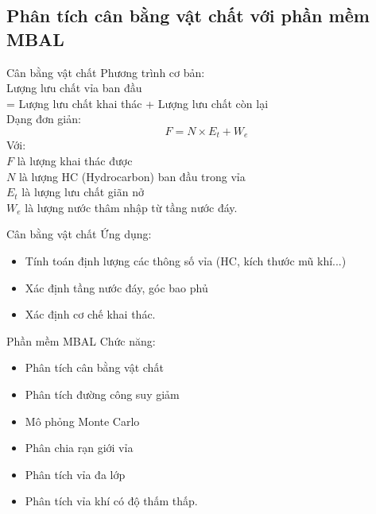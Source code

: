 \documentclass[11pt]{beamer}
\begin{document}
\subsection{Phân tích cân bằng vật chất với phần mềm MBAL}
\begin{frame}{Cân bằng vật chất}
Phương trình cơ bản:\\
\hspace*{1cm} Lượng lưu chất vỉa ban đầu\\
\hspace*{2cm} = Lượng lưu chất khai thác + Lượng lưu chất còn lại\\
Dạng đơn giản:
	\begin{equation}\label{eqn:straight_line}
		F = N \times{E_t} + W_e
	\end{equation}
Với:\\
\hspace*{1cm} $F$ là lượng khai thác được\\
\hspace*{1cm} $N$ là lượng HC (Hydrocarbon) ban đầu trong vỉa\\
\hspace*{1cm} $E_t$ là lượng lưu chất giãn nở\\
\hspace*{1cm} $W_e$ là lượng nước thâm nhập từ tầng nước đáy.
\end{frame}
\begin{frame}{Cân bằng vật chất}
Ứng dụng:
	\begin{itemize}
		\item Tính toán định lượng các thông số vỉa (HC, kích thước mũ khí...)
		\item Xác định tầng nước đáy, góc bao phủ
		\item Xác định cơ chế khai thác.
	\end{itemize}
\end{frame}
\begin{frame}{Phần mềm MBAL}
Chức năng:
	\begin{itemize}
		\item Phân tích cân bằng vật chất
		\item Phân tích đường công suy giảm
		\item Mô phỏng Monte Carlo
		\item Phân chia rạn giới vỉa
		\item Phân tích vỉa đa lớp
		\item Phân tích vỉa khí có độ thấm thấp.
	\end{itemize}
\end{frame}
\end{document}
